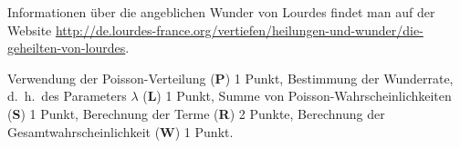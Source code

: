\begin{diskussion}
Informationen über die angeblichen Wunder von Lourdes findet man auf
der Website \url{http://de.lourdes-france.org/vertiefen/heilungen-und-wunder/die-geheilten-von-lourdes}.
\end{diskussion}

\begin{bewertung}
Verwendung der Poisson-Verteilung (\textbf{P}) 1 Punkt,
Bestimmung der Wunderrate, d.~h.~des Parameters $\lambda$ (\textbf{L}) 1 Punkt,
Summe von Poisson-Wahrscheinlichkeiten (\textbf{S}) 1 Punkt,
Berechnung der Terme (\textbf{R}) 2 Punkte,
Berechnung der Gesamtwahrscheinlichkeit (\textbf{W}) 1 Punkt.
\end{bewertung}

